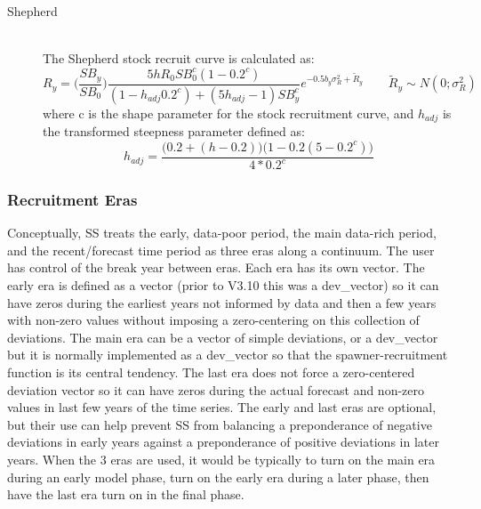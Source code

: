 \begin{description}
	\item[Shepherd]\hfil\\
	\hypertarget{Shepard}{The} Shepherd stock recruit curve is calculated as:
	\begin{equation}
		R_y = \bigg(\frac{SB_y}{SB_0}\bigg)\frac{5hR_0SB^c_0(1-0.2^c)}{(1-h_{adj}0.2^c)+(5h_{adj}-1)SB^c_y}e^{-0.5b_y\sigma^2_R+\tilde{R}_y}\qquad \tilde{R}_y\sim N(0;\sigma^2_R)
	\end{equation}
	where c is the shape parameter for the stock recruitment curve, and $h_{adj}$ is the transformed steepness parameter defined as:
	\begin{equation}
		h_{adj}=\frac{\big(0.2+(h-0.2)\big)\big(1-0.2(5-0.2^c)\big)}{4*0.2^c}
	\end{equation}
\end{description}

\subsubsection{Recruitment Eras}
Conceptually, SS treats the early, data-poor period, the main data-rich period, and the recent/forecast time period as three eras along a continuum.  The user has control of the break year between eras.  Each era has its own vector.  The early era is defined as a vector (prior to V3.10 this was a dev\_vector) so it can have zeros during the earliest years not informed by data and then a few years with non-zero values without imposing a zero-centering on this collection of deviations.  The main era can be a vector of simple deviations, or a dev\_vector but it is normally implemented as a dev\_vector so that the spawner-recruitment function is its central tendency.  The last era does not force a zero-centered deviation vector so it can have zeros during the actual forecast and non-zero values in last few years of the time series.  The early and last eras are optional, but their use can help prevent SS from balancing a preponderance of negative deviations in early years against a preponderance of positive deviations in later years.  When the 3 eras are used, it would be typically to turn on the main era during an early model phase, turn on the early era during a later phase, then have the last era turn on in the final phase.

